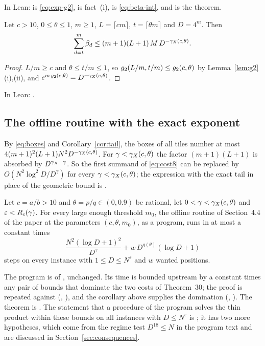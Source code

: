 In Lean:  is \eqref{eq:exp-g2},
 is fact~(i),  is
\eqref{eq:beta-int}, and  is the theorem.

\begin{corollary}\label{cor:tail}
Let \(c>10\), \(0\le\theta\le1\), \(m\ge1\), \(L=\lceil cm\rceil\),
\(t=\lceil\theta m\rceil\) and \(D=4^{m}\).  Then
\[
  \sum_{d=t}^{m}\beta_d\le(m+1)(L+1)\,M\,D^{-\gamma_{X}(c,\theta)} .
\]
\end{corollary}

\begin{proof}
\(L/m\ge c\) and \(\theta\le t/m\le1\), so
\(g_{2}(L/m,t/m)\le g_{2}(c,\theta)\) by Lemma~\ref{lem:g2}(i),(ii), and
\(e^{m\,g_{2}(c,\theta)}=D^{-\gamma_{X}(c,\theta)}\).
\end{proof}

In Lean: .

\subsection{The offline routine with the exact exponent}

By \eqref{eq:boxes} and Corollary~\ref{cor:tail}, the boxes of all tiles number
at most \(4(m+1)^{2}(L+1)N^{2}D^{-\gamma_{X}(c,\theta)}\).  For \(\gamma<\gamma_{X}(c,\theta)\)
the factor \((m+1)(L+1)\) is absorbed by \(D^{\gamma_{X}-\gamma}\).  So the first
summand of \eqref{eq:cost8} can be replaced by \(O(N^{2}\log^{2}D/D^{\gamma})\)
for every \(\gamma<\gamma_{X}(c,\theta)\); the expression with the exact tail in place
of the geometric bound is .

\begin{theorem}\label{thm:offline}
Let \(c=a/b>10\) and \(\theta=p/q\in(0,0.9)\) be rational, let
\(0<\gamma<\gamma_{X}(c,\theta)\) and \(\varepsilon<R_{c}(\gamma)\).  For every large
enough threshold \(m_0\), the offline routine of Section~4.4 of the paper at
the parameters \((c,\theta,m_0)\), as a program, runs in at most a constant
times
\[
  \frac{N^{2}(\log D+1)^{2}}{D^{\gamma}}+w\,D^{q(\theta)}(\log D+1)
\]
steps on every instance with \(1\le D\le N^{\varepsilon}\) and \(w\) wanted
positions.
\end{theorem}

The program is  of \cite{upstream}, unchanged.  Its time is
bounded upstream by a constant times any pair of bounds that dominate the two
costs of Theorem~30; the proof is repeated against 
(, ), and the corollary
above supplies the domination (, ).  The theorem
is .  The statement that a procedure of the program solves
the thin product within these bounds on all instances with \(D\le N^{\varepsilon}\)
is ; it has two more hypotheses, which come from the
regime test \(D^{18}\le N\) in the program text and are discussed in
Section~\ref{sec:consequences}.

